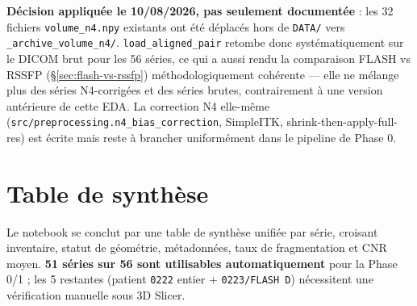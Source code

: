 \textbf{Décision appliquée le 10/08/2026, pas seulement documentée} : les 32 fichiers
\texttt{volume\_n4.npy} existants ont été déplacés hors de \texttt{DATA/} vers
\texttt{\_archive\_volume\_n4/}. \texttt{load\_aligned\_pair} retombe donc systématiquement sur le
DICOM brut pour les 56 séries, ce qui a aussi rendu la comparaison FLASH vs RSSFP
(\S\ref{sec:flash-vs-rssfp}) méthodologiquement cohérente --- elle ne mélange plus des séries
N4-corrigées et des séries brutes, contrairement à une version antérieure de cette EDA. La correction
N4 elle-même (\texttt{src/preprocessing.n4\_bias\_correction}, SimpleITK, shrink-then-apply-full-res)
est écrite mais reste à brancher uniformément dans le pipeline de Phase 0.

\section{Table de synthèse}

Le notebook se conclut par une table de synthèse unifiée par série, croisant inventaire, statut de
géométrie, métadonnées, taux de fragmentation et CNR moyen. \textbf{51 séries sur 56 sont utilisables
automatiquement} pour la Phase 0/1 ; les 5 restantes (patient \texttt{0222} entier +
\texttt{0223/FLASH D}) nécessitent une vérification manuelle sous 3D Slicer.
